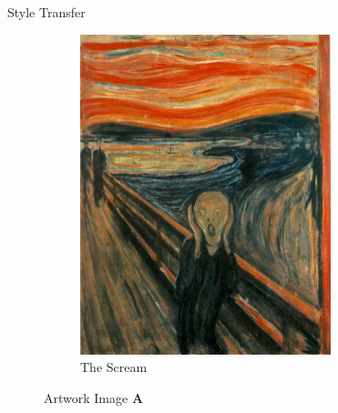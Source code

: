 \documentclass{beamer}
\begin{document}
\begin{frame}{Style Transfer}
\begin{figure}
{\begin{figure}[ht]
    \end{figure}
}{
    \begin{figure}[ht]
    \centering
    \caption*{The Scream}
    \includegraphics[width=0.8\textwidth,height=0.27\textheight]{img/artworks/the-scream}
    \end{figure}
}
\caption*{Artwork Image \textbf{A}}
\end{figure}
\end{frame}
\end{document}
